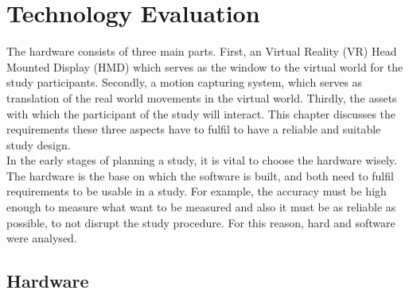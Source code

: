 \chapter{Technology Evaluation}
The hardware consists of three main parts. First, an Virtual Reality (VR) Head Mounted Display (HMD) which serves as the window to the virtual world for the study participants. Secondly, a motion capturing system, which serves as translation of the real world movements in the virtual world. Thirdly, the assets with which the participant of the study will interact. This chapter discusses the requirements these three aspects have to fulfil to have a reliable and suitable study design.\\ 
In the early stages of planning a study, it is vital to choose the hardware wisely. The hardware is the base on which the software is built, and both need to fulfil requirements to be usable in a study. For example, the accuracy must be high enough to measure what want to be measured and also it must be as reliable as possible, to not disrupt the study procedure. For this reason, hard and software were analysed.
\section{Hardware}
